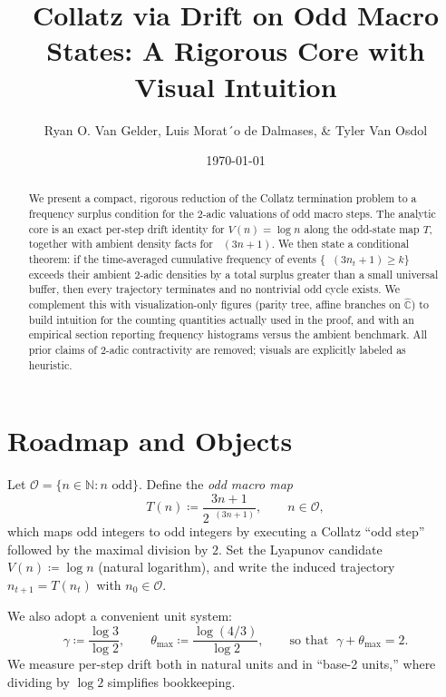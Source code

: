 \documentclass[11pt]{article}
\title{Collatz via Drift on Odd Macro States: A Rigorous Core with Visual Intuition}
\author{Ryan O. Van Gelder, Luis Morat´o de Dalmases, \& Tyler Van Osdol}
\date{\today}
\theoremstyle{plain}
\theoremstyle{definition}
\theoremstyle{remark}
\DeclareMathOperator{\vtwo}{v_2}
\newcommand{\N}{\mathbb{N}}
\newcommand{\Odd}{\mathcal{O}} %
\newcommand{\Todd}{T} %
\newcommand{\V}{V}
\newcommand{\1}{\mathbf{1}}
\begin{document}
\maketitle

 
\begin{abstract}
We present a compact, rigorous reduction of the Collatz termination problem to a frequency surplus condition for the $2$-adic valuations of odd macro steps. The analytic core is an exact per-step drift identity for $\V(n)=\log n$ along the odd-state map $\Todd$, together with ambient density facts for $\vtwo(3n+1)$. We then state a conditional theorem: if the time-averaged cumulative frequency of events $\{\vtwo(3n_t+1)\ge k\}$ exceeds their ambient $2$-adic densities by a total surplus greater than a small universal buffer, then every trajectory terminates and no nontrivial odd cycle exists. We complement this with visualization-only figures (parity tree, affine branches on $\hat{\mathbb C}$) to build intuition for the counting quantities actually used in the proof, and with an empirical section reporting frequency histograms versus the ambient benchmark. All prior claims of $2$-adic contractivity are removed; visuals are explicitly labeled as heuristic.
\end{abstract}

\section{Roadmap and Objects}
Let $\Odd=\{n\in\N: n\text{ odd}\}$. Define the \emph{odd macro map}
\begin{equation}
  \Todd(n) \coloneqq \frac{3n+1}{2^{\vtwo(3n+1)}},\qquad n\in\Odd,
\end{equation}
which maps odd integers to odd integers by executing a Collatz ``odd step'' followed by the maximal division by $2$.
Set the Lyapunov candidate $\V(n)\coloneqq\log n$ (natural logarithm), and write the induced trajectory $n_{t+1}=\Todd(n_t)$ with $n_0\in\Odd$.

We also adopt a convenient unit system:
\begin{equation}
  \gamma \coloneqq \frac{\log 3}{\log 2},\qquad \theta_{\max} \coloneqq \frac{\log(4/3)}{\log 2},\qquad \text{so that }\;\gamma+\theta_{\max}=2.
\end{equation}
We measure per-step drift both in natural units and in ``base-2 units,'' where dividing by $\log 2$ simplifies bookkeeping.
\end{document}
